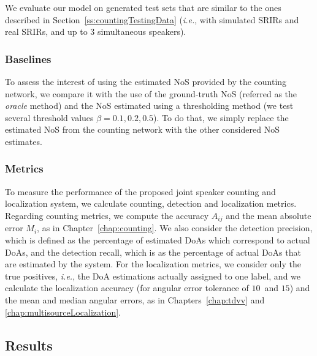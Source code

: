 We evaluate our model on generated test sets that are similar to the ones described in Section~\ref{ss:countingTestingData} (\textit{i.e.}, with simulated SRIRs and real SRIRs, and up to $3$ simultaneous speakers).

\subsubsection{Baselines}

To assess the interest of using the estimated NoS provided by the counting network, we compare it with the use of the ground-truth NoS (referred as the \textit{oracle} method) and the NoS estimated using a thresholding method (we test several threshold values $\beta = 0.1, 0.2, 0.5$). To do that, we simply replace the estimated NoS from the counting network with the other considered NoS estimates.

\subsubsection{Metrics}
\label{ss:detectionCountingLocalizationMetrics}

To measure the performance of the proposed joint speaker counting and localization system, we calculate counting, detection and localization metrics. Regarding counting metrics, we compute the accuracy $A_{ij}$ and the mean absolute error $M_i$, as in Chapter~\ref{chap:counting}. We also consider the detection precision, which is defined as the percentage of estimated DoAs which correspond to actual DoAs, and the detection recall, which is as the percentage of actual DoAs that are estimated by the system. For the localization metrics, we consider only the true positives, \emph{i.e.}, the DoA estimations actually assigned to one label, and we calculate the localization accuracy (for angular error tolerance of $10$\textdegree~and $15$\textdegree) and the mean and median angular errors, as in Chapters~\ref{chap:tdvv} and \ref{chap:multisourceLocalization}.

\subsection{Results}
\label{ss:hybridNosPredictionResults}

